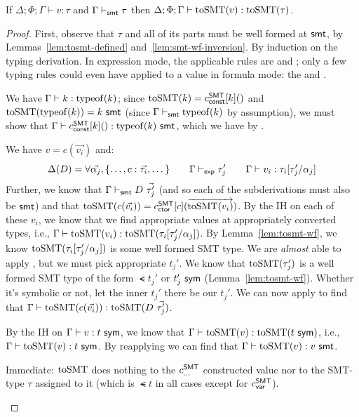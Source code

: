 \documentclass[acmsmall,screen,nonacm]{acmart}
\theoremstyle{definition}
\begin{document}
\begin{lemma}
\label{lem:tosmt-well-typed}
  If $\Delta; \Phi; \Gamma \vdash v : \tau$ and $\Gamma \vdash_{\mathsf{smt}} \tau$ then
  $\Delta; \Phi; \Gamma \vdash \mathrm{toSMT}(v) : \mathrm{toSMT}(\tau)$.
%
  \begin{proof}
  First, observe that $\tau$ and all of its parts must be well formed
  at $\mathsf{smt}$, by Lemmas~\ref{lem:tosmt-defined}
  and~\ref{lem:smt-wf-inversion}.
%    
  By induction on the typing derivation. In expression mode, the
  applicable rules are  and ; only a few
  typing rules could even have applied to a value in formula mode:
  the  and .
%
\begin{proofcases}

  \item[(\rn{$e$-Const})] We have $\Gamma \vdash k : \mathrm{typeof}(k)$;
  since $\mathrm{toSMT}(k) = c^\mathsf{SMT}_{\mathsf{const}}[k]()$ and $\mathrm{toSMT}(\mathrm{typeof}(k)) = {k} ~ \mathsf{smt}$
  (since $\Gamma \vdash_{\mathsf{smt}} \mathrm{typeof}(k)$ by assumption), we must show
  that $\Gamma \vdash c^\mathsf{SMT}_{\mathsf{const}}[k]() : {\mathrm{typeof}(k)} ~ \mathsf{smt}$, which we have
  by .

  \item[(\rn{$e$-Ctor})] We have $v = c(\vec{v_i})$ and:
%
  \[ \Delta(D) = \forall \vec{\alpha_j}, \{ \dots, c : \vec{\tau_i}, \dots \} \quad\quad
      \Gamma \vdash_{\mathsf{exp}} \tau_j' \quad\quad
      \Gamma \vdash v_i : \tau_i[\tau_j'/\alpha_j]
  \]
%
  Further, we know that $\Gamma \vdash_{\mathsf{smt}} D ~ \vec{\tau_j'}$ (and
  so each of the subderivations must also be $\mathsf{smt}$) and that
  $\mathrm{toSMT}(c(\vec{v_i})) = c^\mathsf{SMT}_{\mathsf{ctor}}[c](\overrightarrow{\mathrm{toSMT}(v_i)})$.
%
  By the IH on each of these $v_i$, we know that we find appropriate
  values at appropriately converted types, i.e.,
  $\Gamma \vdash \mathrm{toSMT}(v_i) : \mathrm{toSMT}(\tau_i[\tau_j'/\alpha_j])$. 
%
  By Lemma~\ref{lem:tosmt-wf}, we know
  $\mathrm{toSMT}(\tau_i[\tau_j'/\alpha_j])$ is some well formed SMT type. We
  are \emph{almost} able to apply , but we must
  pick appropriate $t_j'$. We know that $\mathrm{toSMT}(\tau_j')$ is a well
  formed SMT type of the form $\smt{t_j'}$ or ${t_j'} ~ \mathsf{sym}$
  (Lemma~\ref{lem:tosmt-wf}). Whether it's symbolic or not, let
  the inner $t_j'$ there be our $t_j'$. We can now apply  to
  find that $\Gamma \vdash \mathrm{toSMT}(c(\vec{v_i})) : \mathrm{toSMT}(D ~
  \vec{\tau_j'})$.

  \item[(\rn{$\phi$-Promote})] By the IH on $\Gamma \vdash v
  : {t} ~ \mathsf{sym}$, we know that $\Gamma \vdash \mathrm{toSMT}(v)
  : \mathrm{toSMT}({t} ~ \mathsf{sym})$, i.e., $\Gamma \vdash \mathrm{toSMT}(v) : {t} ~ \mathsf{sym}$. By
  reapplying  we can find that
  $\Gamma \vdash \mathrm{toSMT}(v) : {v} ~ \mathsf{smt}$.

  \item[(\rn{$\phi$-Ctor})] Immediate: $\mathrm{toSMT}$ does nothing to the
  $c^\mathsf{SMT}_{\mathsf{\dots}}$ constructed value nor to the SMT-type $\tau$ assigned
  to it (which is $\smt{t}$ in all cases except for $c^\mathsf{SMT}_{\mathsf{var}}$).

\end{proofcases}
\end{proof}
\end{lemma}
\end{document}
